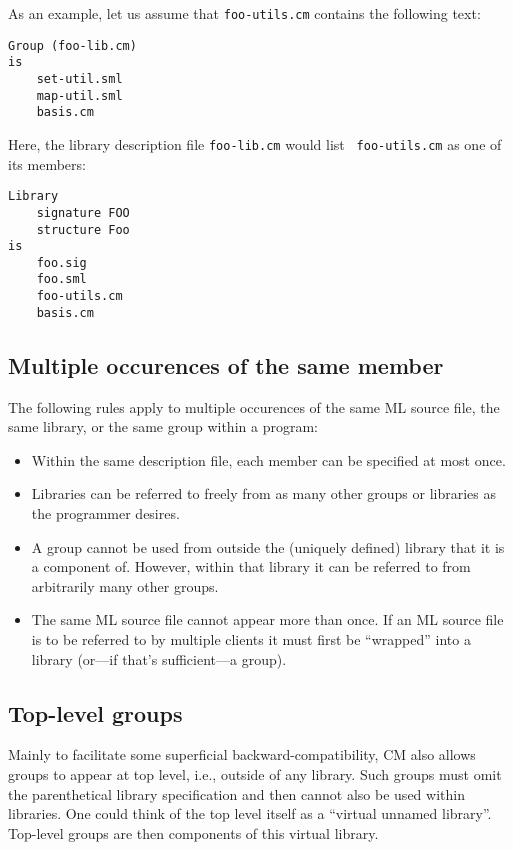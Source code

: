 \documentclass{article}
\begin{document}
As an example, let us assume that {\tt foo-utils.cm} contains the
following text:

\begin{verbatim}
Group (foo-lib.cm)
is
    set-util.sml
    map-util.sml
    basis.cm
\end{verbatim}

Here, the library description file {\tt foo-lib.cm} would list {\tt
foo-utils.cm} as one of its members:

\begin{verbatim}
Library
    signature FOO
    structure Foo
is
    foo.sig
    foo.sml
    foo-utils.cm
    basis.cm
\end{verbatim}

\subsection{Multiple occurences of the same member}

The following rules apply to multiple occurences of the same ML source
file, the same library, or the same group within a program:

\begin{itemize}
\item Within the same description file, each member can be specified
at most once.
\item Libraries can be referred to freely from as many other groups or
libraries as the programmer desires.
\item A group cannot be used from outside the (uniquely defined)
library that it is a component of.  However, within that library it
can be referred to from arbitrarily many other groups.
\item The same ML source file cannot appear more than once.  If an ML
source file is to be referred to by multiple clients it must first be
``wrapped'' into a library (or---if that's sufficient---a group).
\end{itemize}

\subsection{Top-level groups}

Mainly to facilitate some superficial backward-compatibility, CM also
allows groups to appear at top level, i.e., outside of any library.
Such groups must omit the parenthetical library specification and then
cannot also be used within libraries. One could think of the top level
itself as a ``virtual unnamed library''.  Top-level groups are then
components of this virtual library.
\end{document}
